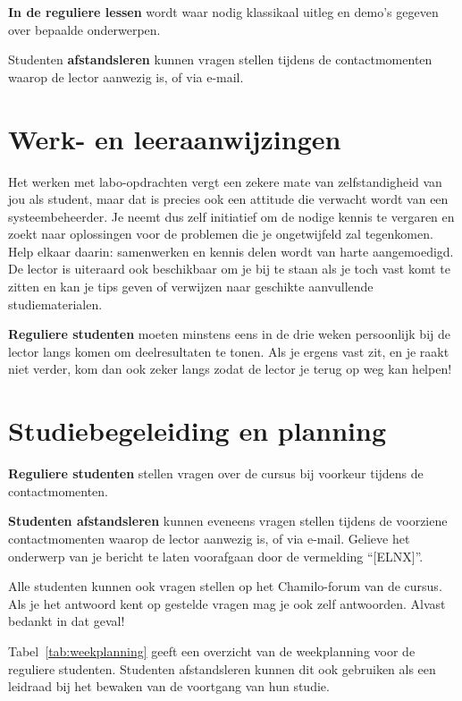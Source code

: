 \textbf{In de reguliere lessen} wordt waar nodig klassikaal uitleg en demo's gegeven over bepaalde onderwerpen.

Studenten \textbf{afstandsleren} kunnen vragen stellen tijdens de contactmomenten waarop de lector aanwezig is, of via e-mail.

\section{Werk- en leeraanwijzingen}
\label{sec:werk-en-leeraanwijzingen}

Het werken met labo-opdrachten vergt een zekere mate van zelfstandigheid van jou als student, maar dat is precies ook een attitude die verwacht wordt van een systeembeheerder. Je neemt dus zelf initiatief om de nodige kennis te vergaren en zoekt naar oplossingen voor de problemen die je ongetwijfeld zal tegenkomen. Help elkaar daarin: samenwerken en kennis delen wordt van harte aangemoedigd. De lector is uiteraard ook beschikbaar om je bij te staan als je toch vast komt te zitten en kan je tips geven of verwijzen naar geschikte aanvullende studiematerialen.

\textbf{Reguliere studenten} moeten minstens eens in de drie weken persoonlijk bij de lector langs komen om deelresultaten te tonen. Als je ergens vast zit, en je raakt niet verder, kom dan ook zeker langs zodat de lector je terug op weg kan helpen!

\section{Studiebegeleiding en planning}
\label{sec:studiebegeleiding-en-planning}

\textbf{Reguliere studenten} stellen vragen over de cursus bij voorkeur tijdens de contactmomenten.

\textbf{Studenten afstandsleren} kunnen eveneens vragen stellen tijdens de voorziene contactmomenten waarop de lector aanwezig is, of via e-mail. Gelieve het onderwerp van je bericht te laten voorafgaan door de vermelding ``[ELNX]''.

Alle studenten kunnen ook vragen stellen op het Chamilo-forum van de cursus. Als je het antwoord kent op gestelde vragen mag je ook zelf antwoorden. Alvast bedankt in dat geval!

Tabel~\ref{tab:weekplanning} geeft een overzicht van de weekplanning voor de reguliere studenten. Studenten afstandsleren kunnen dit ook gebruiken als een leidraad bij het bewaken van de voortgang van hun studie.

